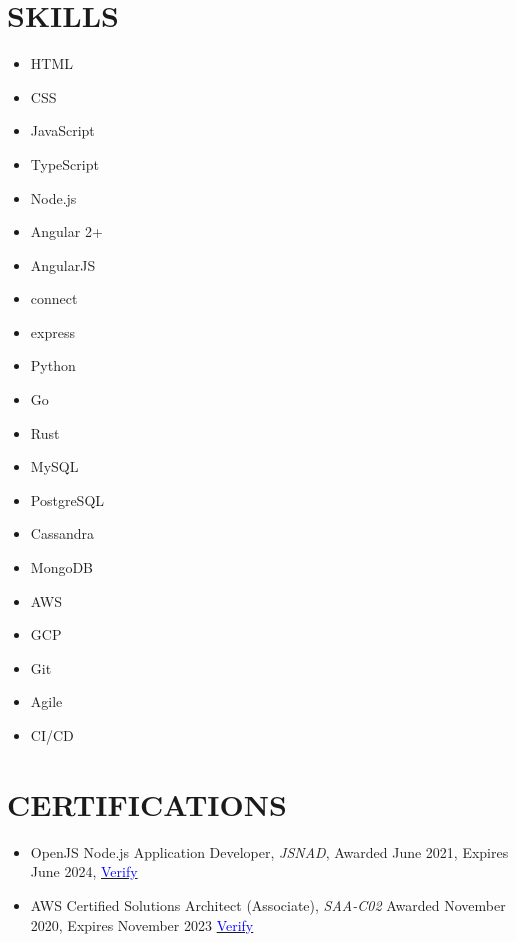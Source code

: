 \documentclass[margin]{res}
\begin{document}
\begin{resume}
	\section{\textcolor{NavyBlue}{SKILLS}}
	\begin{multicols}{3}
		\begin{itemize}
			\item HTML
			\item CSS
			\item JavaScript
			\item TypeScript
			\item Node.js
			\item Angular 2+
			\item AngularJS
			\item connect
			\item express
			\item Python
			\item Go
			\item Rust
			\item MySQL
			\item PostgreSQL
			\item Cassandra
			\item MongoDB
			\item AWS
			\item GCP
			\item Git
			\item Agile
			\item CI/CD
		\end{itemize}
	\end{multicols}

	\section{\textcolor{NavyBlue}{CERTIFICATIONS}}
	\begin{itemize} %
		\item OpenJS Node.js Application Developer, \textit{JSNAD}, Awarded June 2021, Expires June 2024,
		      \href{https://www.youracclaim.com/badges/76bcd62c-af5b-4957-b9ef-533403369d8d}{\textcolor{blue}{Verify}}

		\item AWS Certified Solutions Architect (Associate), \textit{SAA-C02} Awarded November 2020, Expires November 2023
		      \href{https://www.youracclaim.com/badges/4b572dd0-85e9-45f5-90f8-90a68cd3399f}{\textcolor{blue}{Verify}}


\end{itemize}
\end{resume}
\end{document}
